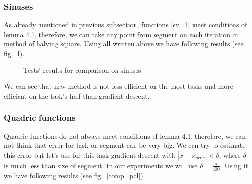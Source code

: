 \documentclass[12pt]{article}
\begin{document}
\subsubsection{Sinuses}  

As already mentioned in previous subsection, functions \eqref{ex_1} meet conditions of lemma 4.1, therefore, we can take any point from segment on each iteration in method of halving square. Using all written above we have following results (see fig.~\ref{comp_sinuses}).

\begin{figure}[h!]
\caption{Tests' results for comparison on sinuses}
\label{comp_sinuses}
\end{figure}

We can see that new method is not less efficient on the most tasks and more efficient on the task's half than gradient descent.

\subsubsection{Quadric functions}

Quadric functions do not always meet conditions of lemma 4.1, therefore, we can not think that error for task on segment can be very big. We can try to estimate this error but let's use for this task gradient descent with $|x-x_{prev}|<\delta$, where $\delta$ is much less than size of segment. In our experiments we will use $\delta = \frac{a}{400}$. Using it we have following results (see fig.~\ref{comp_pol}).
\end{document}
